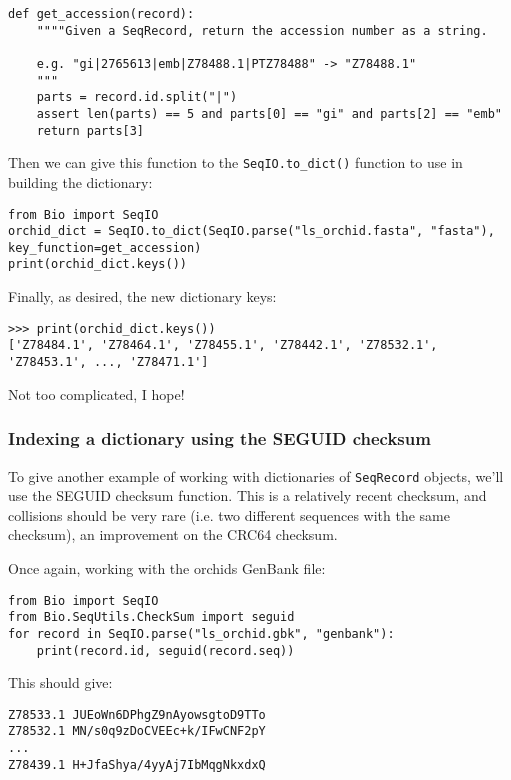 \documentclass{report}
\begin{document}
\begin{verbatim}
def get_accession(record):
    """"Given a SeqRecord, return the accession number as a string.
  
    e.g. "gi|2765613|emb|Z78488.1|PTZ78488" -> "Z78488.1"
    """
    parts = record.id.split("|")
    assert len(parts) == 5 and parts[0] == "gi" and parts[2] == "emb"
    return parts[3]
\end{verbatim}

\noindent Then we can give this function to the \verb|SeqIO.to_dict()| function to use in building the dictionary:

\begin{verbatim}
from Bio import SeqIO
orchid_dict = SeqIO.to_dict(SeqIO.parse("ls_orchid.fasta", "fasta"), key_function=get_accession)
print(orchid_dict.keys())
\end{verbatim}

\noindent Finally, as desired, the new dictionary keys:

\begin{verbatim}
>>> print(orchid_dict.keys())
['Z78484.1', 'Z78464.1', 'Z78455.1', 'Z78442.1', 'Z78532.1', 'Z78453.1', ..., 'Z78471.1']
\end{verbatim}

\noindent Not too complicated, I hope!

\subsubsection{Indexing a dictionary using the SEGUID checksum}

To give another example of working with dictionaries of \verb|SeqRecord| objects, we'll use the SEGUID checksum function.  This is a relatively recent checksum, and collisions should be very rare (i.e. two different sequences with the same checksum), an improvement on the CRC64 checksum.

Once again, working with the orchids GenBank file:

\begin{verbatim}
from Bio import SeqIO
from Bio.SeqUtils.CheckSum import seguid
for record in SeqIO.parse("ls_orchid.gbk", "genbank"):
    print(record.id, seguid(record.seq))
\end{verbatim}

\noindent This should give:

\begin{verbatim}
Z78533.1 JUEoWn6DPhgZ9nAyowsgtoD9TTo
Z78532.1 MN/s0q9zDoCVEEc+k/IFwCNF2pY
...
Z78439.1 H+JfaShya/4yyAj7IbMqgNkxdxQ
\end{verbatim}
\end{document}
